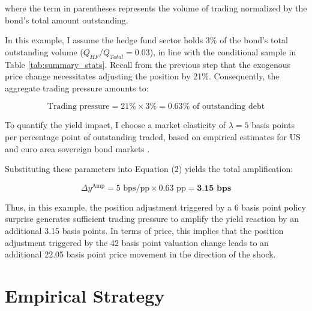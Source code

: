 \documentclass[english, 11pt, oneside]{article}
\begin{document}
where the term in parentheses represents the volume of trading normalized by the bond's total amount outstanding.

In this example, I assume the hedge fund sector holds 3\% of the bond's total outstanding volume ($Q_{HF}/Q_{Total} = 0.03$), in line with the conditional sample in Table \ref{tab:summary_stats}. Recall from the previous step that the exogenous price change necessitates adjusting the position by 21\%. Consequently, the aggregate trading pressure amounts to:

\begin{equation*}
\text{Trading pressure} = 21\% \times 3\% = 0.63\% \text{ of outstanding debt}
\end{equation*}

To quantify the yield impact, I choose a market elasticity of $\lambda = 5$ basis points per percentage point of outstanding traded, based on empirical estimates for US and euro area sovereign bond markets \citep{damico2013, eser2016, desantis2020}.

Substituting these parameters into Equation (2) yields the total amplification:

\begin{equation*}
\Delta y^{\text{Amp}} = 5 \text{ bps/pp} \times 0.63 \text{ pp} = \textbf{3.15 bps}
\end{equation*}

Thus, in this example, the position adjustment triggered by a 6 basis point policy surprise generates sufficient trading pressure to amplify the yield reaction by an additional 3.15 basis points. In terms of price, this implies that the position adjustment triggered by the 42 basis point valuation change leads to an additional 22.05 basis point price movement in the direction of the shock.





\section{Empirical Strategy}
\label{sec:empirical_strategy}
\end{document}
